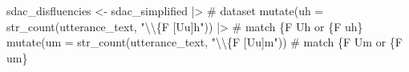 \documentclass[
  letterpaper,
]{latex/krantz}
\newenvironment{Shaded}{\begin{snugshade}}{\end{snugshade}}
\newcommand{\AttributeTok}[1]{\textcolor[rgb]{0.40,0.45,0.13}{#1}}
\newcommand{\CommentTok}[1]{\textcolor[rgb]{0.37,0.37,0.37}{#1}}
\newcommand{\FunctionTok}[1]{\textcolor[rgb]{0.28,0.35,0.67}{#1}}
\newcommand{\NormalTok}[1]{\textcolor[rgb]{0.00,0.23,0.31}{#1}}
\newcommand{\OtherTok}[1]{\textcolor[rgb]{0.00,0.23,0.31}{#1}}
\newcommand{\SpecialCharTok}[1]{\textcolor[rgb]{0.37,0.37,0.37}{#1}}
\newcommand{\StringTok}[1]{\textcolor[rgb]{0.13,0.47,0.30}{#1}}
\begin{document}
\begin{Shaded}
\begin{Highlighting}[]
\NormalTok{sdac\_disfluencies }\OtherTok{\textless{}{-}} 
\NormalTok{  sdac\_simplified }\SpecialCharTok{|\textgreater{}} \CommentTok{\# dataset}
  \FunctionTok{mutate}\NormalTok{(}\AttributeTok{uh =} \FunctionTok{str\_count}\NormalTok{(utterance\_text, }\StringTok{"}\SpecialCharTok{\textbackslash{}\textbackslash{}}\StringTok{\{F [Uu]h"}\NormalTok{)) }\SpecialCharTok{|\textgreater{}} \CommentTok{\# match \{F Uh or \{F uh\}}
  \FunctionTok{mutate}\NormalTok{(}\AttributeTok{um =} \FunctionTok{str\_count}\NormalTok{(utterance\_text, }\StringTok{"}\SpecialCharTok{\textbackslash{}\textbackslash{}}\StringTok{\{F [Uu]m"}\NormalTok{)) }\CommentTok{\# match \{F Um or \{F um\}}
\end{Highlighting}
\end{Shaded}
\end{document}
